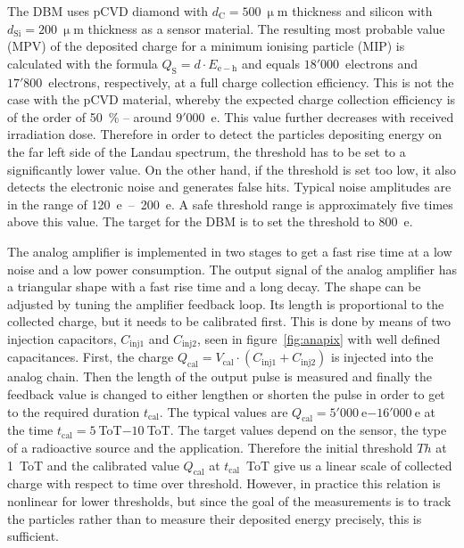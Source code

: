 The DBM uses pCVD diamond with $d_\mathrm{C}=500~\upmu$m thickness and silicon with $d_\mathrm{Si}=200~\upmu$m thickness as a sensor material. The resulting most probable value (MPV) of the deposited charge for a minimum ionising particle (MIP) is calculated with the formula $Q_\mathrm{S}=d \cdot E_\mathrm{e-h}$ and equals $18'000$~electrons and $17'800$~electrons, respectively, at a full charge collection efficiency. This is not the case with the pCVD material, whereby the expected charge collection efficiency is of the order of 50~\%  -- around $9'000$~e. This value further decreases with received irradiation dose. Therefore in order to detect the particles depositing energy on the far left side of the Landau spectrum, the threshold has to be set to a significantly lower value. On the other hand, if the threshold is set too low, it also detects the electronic noise and generates false hits. Typical noise amplitudes are in the range of 120~e~--~200~e. A safe threshold range is approximately five times above this value. The target for the DBM is to set the threshold to 800~e.

The analog amplifier is implemented in two stages to get a fast rise time at a low noise and a low power consumption. The output signal of the analog amplifier has a triangular shape with a fast rise time and a long decay.  The shape can be adjusted by tuning the amplifier feedback loop. Its length is proportional to the collected charge, but it needs to be calibrated first. This is done by means of two injection capacitors, $C_\mathrm{inj1}$ and $C_\mathrm{inj2}$, seen in figure~\ref{fig:anapix} with well defined capacitances. First, the charge $Q_\mathrm{cal}=V_\mathrm{cal}\cdot(C_\mathrm{inj1}+C_\mathrm{inj2})$ is injected into the analog chain. Then the length of the output pulse is measured and finally the feedback value is changed to either lengthen or shorten the pulse in order to get to the required duration $t_\mathrm{cal}$. The typical values are $Q_\mathrm{cal}=5'000~$e$-16'000~$e at the time $t_\mathrm{cal}=5~$ToT$-10~$ToT. The target values depend on the sensor, the type of a radioactive source and the application. Therefore the initial threshold $Th$ at 1~ToT and the calibrated value $Q_\mathrm{cal}$ at $t_\mathrm{cal}$~ToT give us a linear scale of collected charge with respect to time over threshold.
However, in practice this relation is nonlinear for lower thresholds, but since the goal of the measurements is to track the particles rather than to measure their deposited energy precisely, this is sufficient. 


